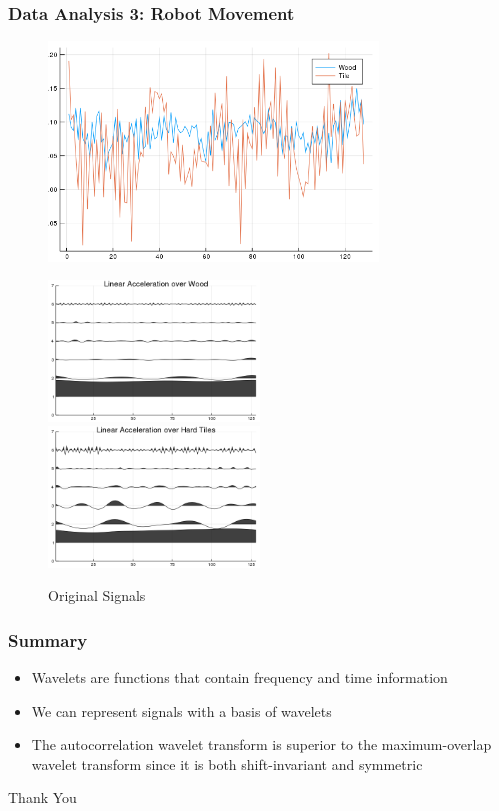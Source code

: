 \documentclass[aspectratio=169]{beamer}
\begin{document}
\begin{frame}
\frametitle{Data Analysis 3: Robot Movement}
    \begin{figure}
        \centering
        \includegraphics[height=0.17\textheight,width=0.78\textwidth]{wood_tile_plot.png}
        \caption{Original Signals}
        
        \includegraphics[width=0.5\textwidth]{wood_plot}
        \includegraphics[width=0.5\textwidth]{tile_plot.png}
    \end{figure}
    
    
\end{frame}


\begin{frame}
\frametitle{Summary}
\begin{itemize}
    \item Wavelets are functions that contain frequency and time information
    \item We can represent signals with a basis of wavelets
    \item The autocorrelation wavelet transform is superior to the maximum-overlap wavelet transform since it is both shift-invariant and symmetric
\end{itemize}
\end{frame}

\begin{frame}{}
  \centering \Huge
  Thank You
\end{frame}
\end{document}

